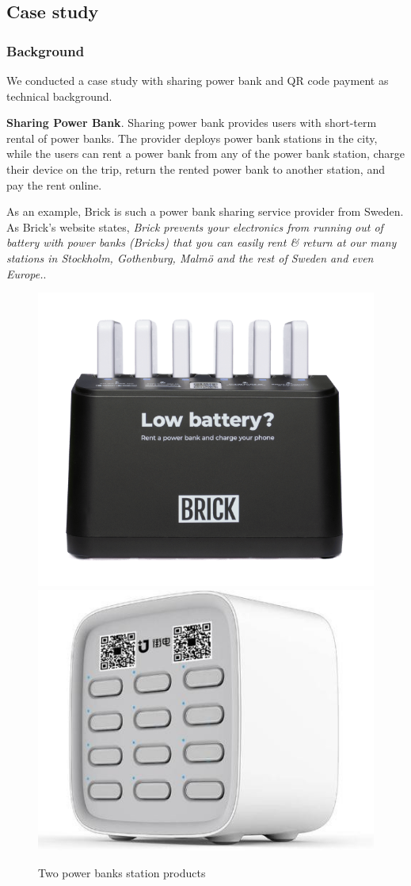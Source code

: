 \subsection{Case study}

\subsubsection{Background}

We conducted a case study with sharing power bank and QR code payment as technical background.

\textbf{Sharing Power Bank}. 
Sharing power bank provides users with short-term rental of power banks. 
The provider deploys power bank stations in the city, while the users can rent a power bank from any of the power bank station, charge their device on the trip, return the rented power bank to another station, and pay the rent online.

As an example, Brick is such a power bank sharing service provider from Sweden. 
As Brick's website states, \textit{Brick prevents your electronics from running out of battery with power banks (Bricks) that you can easily rent \& return at our many stations in Stockholm, Gothenburg, Malmö and the rest of Sweden and even Europe.}. 

\begin{figure}[t]
	\centering
	\includegraphics[width=.4 \linewidth]{./Figs/Brick_station.png}
	\includegraphics[width=.4 \linewidth]{./Figs/jiedian.jpg}
	\caption{Two power banks station products}
	\label{fig:PBS_products}
\end{figure}

